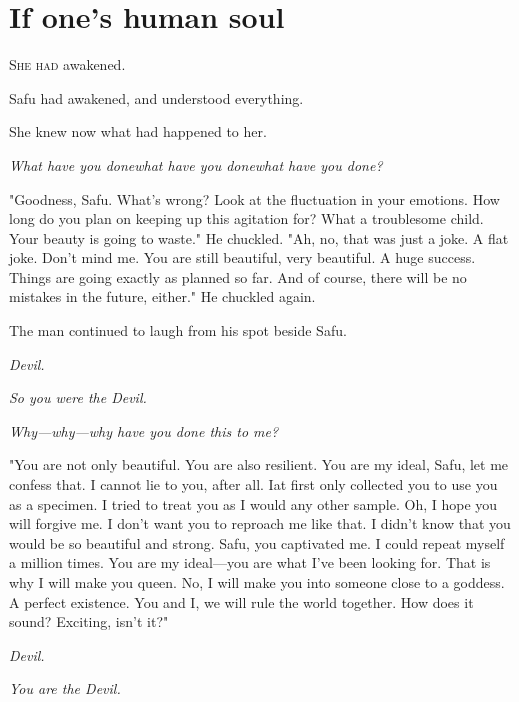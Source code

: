 
\chapter{If one's human soul}


\lettrine{S}{he had} awakened.

Safu had awakened, and understood everything.

She knew now what had happened to her.

\emph{What have you done\el what have you done\el what have you done?}

"Goodness, Safu. What's wrong? Look at the fluctuation in your emotions.
How long do you plan on keeping up this agitation for? What a
troublesome child. Your beauty is going to waste." He chuckled. "Ah, no,
that was just a joke. A flat joke. Don't mind me. You are still
beautiful, very beautiful. A huge success. Things are going exactly as
planned so far. And of course, there will be no mistakes in the future,
either." He chuckled again.

The man continued to laugh from his spot beside Safu.

\emph{Devil.}

\emph{So you were the Devil.}

\emph{Why---why---why have you done this to me?}

"You are not only beautiful. You are also resilient. You are my ideal,
Safu, let me confess that. I cannot lie to you, after all. I\el at first
only collected you to use you as a specimen. I tried to treat you as I
would any other sample. Oh, I hope you will forgive me. I don't want you
to reproach me like that. I didn't know that you would be so beautiful
and strong. Safu, you captivated me. I could repeat myself a million
times. You are my ideal---you are what I've been looking for. That is why
I will make you queen. No, I will make you into someone close to a
goddess. A perfect existence. You and I, we will rule the world
together. How does it sound? Exciting, isn't it?"

\emph{Devil.}

\emph{You are the Devil.}

